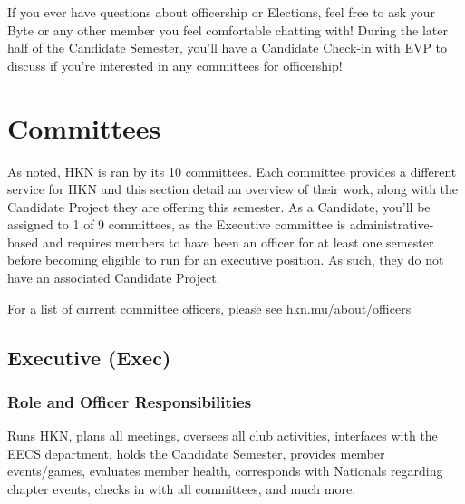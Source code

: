 \documentclass[11pt, article, oneside]{memoir}
\begin{document}
        If you ever have questions about officership or Elections, feel free to ask your Byte or any other member you feel comfortable chatting with! During the later half of the Candidate Semester, you'll have a Candidate Check-in with EVP to discuss if you're interested in any committees for officership!



    \newpage
    \chapter{Committees}

    As noted, HKN is ran by its 10 committees. Each committee provides a different service for HKN and this section detail an overview of their work, along with the Candidate Project they are offering this semester. As a Candidate, you'll be assigned to 1 of 9 committees, as the Executive committee is administrative-based and requires members to have been an officer for at least one semester before becoming eligible to run for an executive position. As such, they do not have an associated Candidate Project.

    \bigbreak

    For a list of current committee officers, please see \href{https://hkn.mu/about/officers}{hkn.mu/about/officers}

    \section{Executive (Exec)}
    \subsection{Role and Officer Responsibilities}
        Runs HKN, plans all meetings, oversees all club activities, interfaces with the EECS department, holds the Candidate Semester, provides member events/games, evaluates member health, corresponds with Nationals regarding chapter events, checks in with all committees, and much more. 
\end{document}

